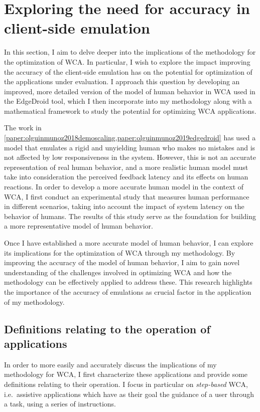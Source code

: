 \section{Exploring the need for accuracy in client-side emulation}\label{summary:realism}

In this section, I aim to delve deeper into the implications of the methodology for the optimization of \gls{WCA}.
In particular, I wish to explore the impact improving the accuracy of the client-side emulation has on the potential for optimization of the applications under evaluation.
I approach this question by developing an improved, more detailed version of the model of human behavior in \gls{WCA} used in the EdgeDroid tool, which I then incorporate into my methodology along with a mathematical framework to study the potential for optimizing \gls{WCA} applications. 

The work in \cref{paper:olguinmunoz2018demoscaling,paper:olguinmunoz2019edgedroid} has used a model that emulates a rigid and unyielding human who makes no mistakes and is not affected by low responsiveness in the system.
However, this is not an accurate representation of real human behavior, and a more realistic human model must take into consideration the perceived feedback latency and its effects on human reactions.
In order to develop a more accurate human model in the context of \gls{WCA}, I first conduct an experimental study that measures human performance in different scenarios, taking into account the impact of system latency on the behavior of humans.
The results of this study serve as the foundation for building a more representative model of human behavior.

Once I have established a more accurate model of human behavior, I can explore its implications for the optimization of \gls{WCA} through my methodology.
By improving the accuracy of the model of human behavior, I aim to gain novel understanding of the challenges involved in optimizing \gls{WCA} and how the methodology can be effectively applied to address these.
This research highlights the importance of the accuracy of emulations as  crucial factor in the application of my methodology.

\subsection{Definitions relating to the operation of  applications}

In order to more easily and accurately discuss the implications of my methodology for \gls{WCA}, I first characterize these applications and provide some definitions relating to their operation.
I focus in particular on \emph{step-based} \gls{WCA}, i.e.\ assistive applications which have as their goal the guidance of a user through a task, using a series of instructions.

